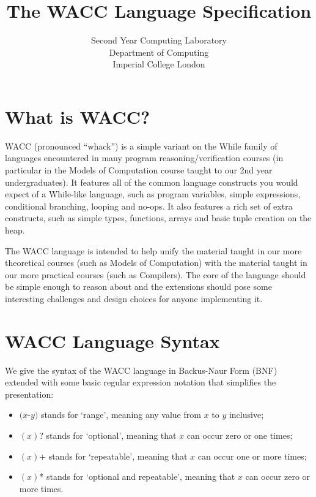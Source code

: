 \documentclass[a4paper]{article}
\theoremstyle{definition}
\begin{document}
\title{The WACC Language Specification}
\date{}
\author{
Second Year Computing Laboratory \\
Department of Computing \\
Imperial College London
}

\maketitle

\section{What is WACC?}
WACC (pronounced ``whack'') is a simple variant on the While family of languages encountered in many program reasoning/verification courses
(in particular in the Models of Computation course taught to our 2nd year undergraduates).
It features all of the common language constructs you would expect of a While-like language,
such as program variables, simple expressions, conditional branching, looping and no-ops.
It also features a rich set of extra constructs, such as simple types, functions, arrays and basic tuple creation on the heap.

The WACC language is intended to help unify the material taught in our more theoretical courses (such as Models of Computation)
with the material taught in our more practical courses (such as Compilers).
The core of the language should be simple enough to reason about
and the extensions should pose some interesting challenges and design choices for anyone implementing it.


\section{WACC Language Syntax}
We give the syntax of the WACC language in Backus-Naur Form (BNF)
extended with some basic regular expression notation that simplifies the presentation:
\begin{itemize}
 \item $(x$-$y)$ stands for `range', meaning any value from $x$ to $y$ inclusive;
 \item $(x)$? stands for `optional', meaning that $x$ can occur zero or one times;
 \item $(x)$+ stands for `repeatable', meaning that $x$ can occur one or more times;
 \item $(x)$* stands for `optional and repeatable', meaning that $x$ can occur zero or more times.
\end{itemize}
\end{document}
